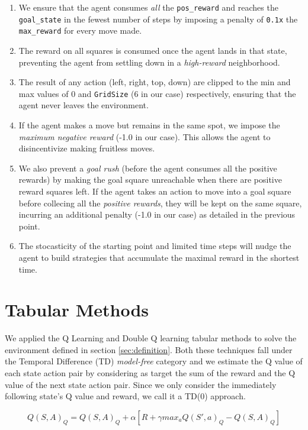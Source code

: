 \documentclass{article} %
\begin{document}
\begin{enumerate}
    \item We ensure that the agent consumes \textit{all} the \verb|pos_reward| and reaches
        the \verb|goal_state| in the fewest number of steps by imposing a penalty of \verb|0.1x|
        the \verb|max_reward| for every move made.
    \item The reward on all squares is consumed once the agent lands in that state, preventing 
    the agent from settling down in a \textit{high-reward} neighborhood.
    \item The result of any action (left, right, top, down) are clipped to the min and max
        values of 0 and \verb|GridSize| (6 in our case) respectively, ensuring that the
        agent never leaves the environment.
    \item If the agent makes a move but remains in the same spot, we impose the \textit{maximum negative
        reward} (-1.0 in our case). This allows the agent to disincentivize making fruitless
        moves.
    \item We also prevent a \textit{goal rush} (before the agent consumes all the positive
        rewards) by making the goal square unreachable when there are positive reward squares
        left. If the agent takes an action to move into a goal square before collecing all the
        \textit{positive rewards}, they will be kept on the same square, incurring an additional
        penalty (-1.0 in our case) as detailed in the previous point.
    \item The stocasticity of the starting point and limited time steps will nudge the agent
        to build strategies that accumulate the maximal reward in the shortest time.
\end{enumerate}

\section{Tabular Methods}
We applied the Q Learning and Double Q learning tabular methods to solve the environment
defined in section \ref{sec:definition}. Both these techniques fall under the Temporal 
Difference (TD) \textit{model-free} category and we estimate the Q value of each state action pair
by considering as target the sum of the reward and the Q value of the next state action pair.
Since we only consider the immediately following state's Q value and reward, we call it a TD(0)
approach.

\begin{equation}
    Q(S,A)_Q = Q(S,A)_Q + \alpha[R+\gamma max_a Q(S', a)_Q-Q(S,A)_Q]
    \label{eqn:q-update}
\end{equation}
\end{document}
